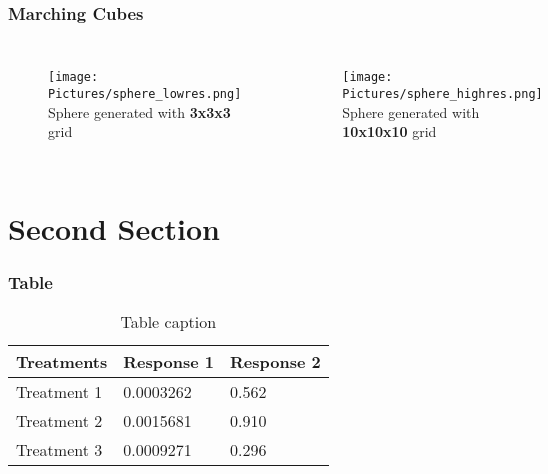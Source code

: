 \documentclass[12pt]{beamer}
\begin{document}
        \begin{frame}
            \frametitle{Marching Cubes}
            \begin{columns}[c] %


                \begin{figure}
                    \texttt{[image: Pictures/sphere\_lowres.png]}\\
                    \small{Sphere generated with \textbf{3x3x3} grid}

                \end{figure}
                \begin{figure}
                    \texttt{[image: Pictures/sphere\_highres.png]}\\
                    \small{Sphere generated with \textbf{10x10x10} grid}

                \end{figure}
            \end{columns}
        \end{frame}

        \section{Second Section}

        \begin{frame}
            \frametitle{Table}
            \begin{table}
                \begin{tabular}{l l l}
                    \toprule
                    \textbf{Treatments} & \textbf{Response 1} & \textbf{Response 2}\\
                    \midrule
                    Treatment 1 & 0.0003262 & 0.562 \\
                    Treatment 2 & 0.0015681 & 0.910 \\
                    Treatment 3 & 0.0009271 & 0.296 \\
                    \bottomrule
                \end{tabular}
                \caption{Table caption}
            \end{table}
        \end{frame}
\end{document}
